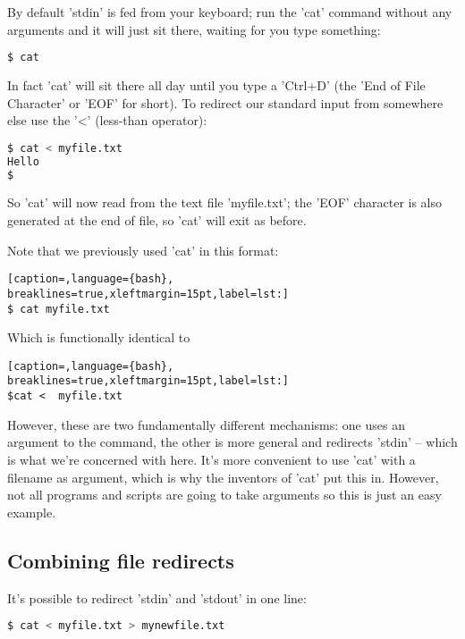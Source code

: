 By default 'stdin' is fed from your keyboard; run the 'cat' command without any
arguments and it will just sit there, waiting for you type something:
\lstset{basicstyle=\scriptsize, numbers=left, captionpos=b, tabsize=4}
\begin{lstlisting}[caption=cat ???,language={bash},
breaklines=true,xleftmargin=15pt,label=lst:cat]
$ cat
\end{lstlisting}

In fact 'cat' will sit there all day until you type a 'Ctrl+D' (the 'End of
File Character' or 'EOF' for short). To redirect our standard input from
somewhere else use the '\textless{}' (less-than operator):
\lstset{basicstyle=\scriptsize, numbers=left, captionpos=b, tabsize=4}
\begin{lstlisting}[caption=Redirecting into the standard input,language={bash},
breaklines=true,xleftmargin=15pt,label=lst:Redirecting into the standard input]
$ cat < myfile.txt
Hello
$
\end{lstlisting}

So 'cat' will now read from the text file 'myfile.txt'; the 'EOF' character is
also generated at the end of file, so 'cat' will exit as before.

Note that we previously used 'cat' in this format:
\lstset{basicstyle=\scriptsize, numbers=left, captionpos=b, tabsize=4}
\begin{lstlisting}[caption=,language={bash},
breaklines=true,xleftmargin=15pt,label=lst:]
$ cat myfile.txt
\end{lstlisting}

Which is functionally identical to 
\lstset{basicstyle=\scriptsize, numbers=left, captionpos=b, tabsize=4}
\begin{lstlisting}[caption=,language={bash},
breaklines=true,xleftmargin=15pt,label=lst:]
$cat <  myfile.txt
\end{lstlisting}

However, these are two fundamentally different mechanisms: one uses an argument
to the command, the other is more general and redirects 'stdin' -- which is
what we're concerned with here. It's more convenient to use 'cat' with a
filename as argument, which is why the inventors of 'cat' put this in. However,
not all programs and scripts are going to take arguments so this is just an
easy example.

\subsection{Combining file redirects}
It's possible to redirect 'stdin' and 'stdout' in one line:
\lstset{basicstyle=\scriptsize, numbers=left, captionpos=b, tabsize=4}
\begin{lstlisting}[caption=Redirecting input to and output from cat at the same time,language={bash},
breaklines=true,xleftmargin=15pt,label=lst:Redirecting input to and output from cat at the same time]
$ cat < myfile.txt > mynewfile.txt
\end{lstlisting}

